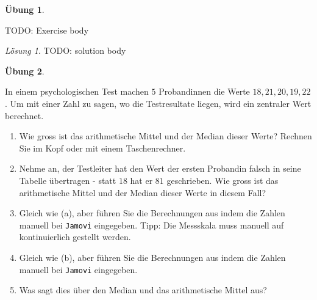\documentclass[
]{book}
\providecommand{\tightlist}{%
  \setlength{\itemsep}{0pt}\setlength{\parskip}{0pt}}
\theoremstyle{definition}
\theoremstyle{definition}
\theoremstyle{definition}
\newtheorem{exercise}{Übung}[chapter]
\theoremstyle{definition}
\theoremstyle{remark}
\newtheorem*{solution}{Lösung}
\begin{document}
\begin{exercise}
\protect\hypertarget{exr:temptag-pvai8hwv}{}\label{exr:temptag-pvai8hwv}\leavevmode

TODO: Exercise body

\end{exercise}

\begin{solution}
TODO: solution body
\end{solution}

\begin{exercise}
\protect\hypertarget{exr:theorie-mdn-mean}{}\label{exr:theorie-mdn-mean}\leavevmode

In einem psychologischen Test machen \(5\) Probandinnen die Werte \(18, 21, 20, 19, 22\). Um mit einer Zahl zu sagen, wo die Testresultate liegen, wird ein zentraler Wert berechnet.

\begin{enumerate}
\def\labelenumi{(\alph{enumi})}
\tightlist
\item
  Wie gross ist das arithmetische Mittel und der Median dieser Werte? Rechnen Sie im Kopf oder mit einem Taschenrechner.
\item
  Nehme an, der Testleiter hat den Wert der ersten Probandin falsch in seine Tabelle übertragen - statt \(18\) hat er \(81\) geschrieben. Wie gross ist das arithmetische Mittel und der Median dieser Werte in diesem Fall?
\item
  Gleich wie (a), aber führen Sie die Berechnungen aus indem die Zahlen manuell bei \texttt{Jamovi} eingegeben. Tipp: Die Messskala muss manuell auf kontinuierlich gestellt werden.
\item
  Gleich wie (b), aber führen Sie die Berechnungen aus indem die Zahlen manuell bei \texttt{Jamovi} eingegeben.
\item
  Was sagt dies über den Median und das arithmetische Mittel aus?
\end{enumerate}

\end{exercise}
\end{document}
